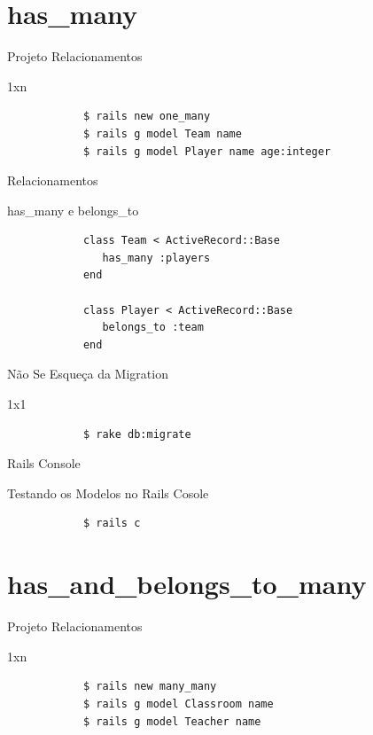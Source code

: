 \documentclass{beamer}
\begin{document}
\section{has\_many}
\begin{frame}[fragile]{Projeto Relacionamentos}
	\begin{block} {1xn}
		\begin{verbatim}
		  	$ rails new one_many
		  	$ rails g model Team name 
		  	$ rails g model Player name age:integer
		\end{verbatim}
	\end{block}
\end{frame}

\begin{frame}[fragile]{Relacionamentos}
	\begin{block} {\LARGE has\_many e belongs\_to}
		\begin{verbatim}
		  	class Team < ActiveRecord::Base
		  	   has_many :players
		  	end
		  	
		  	class Player < ActiveRecord::Base
		  	   belongs_to :team
		  	end
		\end{verbatim}
	\end{block}
\end{frame}

\begin{frame}[fragile]{Não Se Esqueça da Migration}
	\begin{block} {1x1}
		\begin{verbatim}
		  	$ rake db:migrate
		\end{verbatim}
	\end{block}
\end{frame}

\begin{frame}[fragile]{Rails Console}
	\begin{block} {\LARGE Testando os Modelos no Rails Cosole}
		\begin{verbatim}
			$ rails c
		\end{verbatim}
	\end{block}
\end{frame}

\section{has\_and\_belongs\_to\_many}

\begin{frame}[fragile]{Projeto Relacionamentos}
	\begin{block} {1xn}
		\begin{verbatim}
		  	$ rails new many_many
		  	$ rails g model Classroom name 
		  	$ rails g model Teacher name
		\end{verbatim}
	\end{block}
\end{frame}
\end{document}
